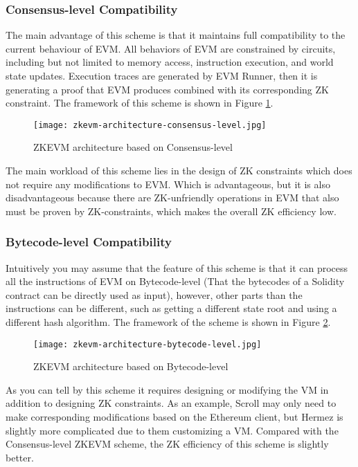\subsubsection{Consensus-level Compatibility}

The main advantage of this scheme is that it maintains full compatibility to the current behaviour of EVM. All behaviors of EVM are constrained by circuits, including but not limited to memory access, instruction execution, and world state updates. Execution traces are generated by EVM Runner, then it is generating a proof that EVM produces combined with its corresponding ZK constraint. The framework of this scheme is shown in Figure \ref{fig:zkevm-architecture-consensus-level}.
\begin{figure}[!ht]
    \centering
    \texttt{[image: zkevm-architecture-consensus-level.jpg]}
    \caption{ZKEVM architecture based on Consensus-level}
    \label{fig:zkevm-architecture-consensus-level}
\end{figure}

The main workload of this scheme lies in the design of ZK constraints which does not require any modifications to EVM. Which is advantageous, but it is also disadvantageous because there are ZK-unfriendly operations in EVM that also must be proven by ZK-constraints, which makes the overall ZK efficiency low.

\subsubsection{Bytecode-level Compatibility}

Intuitively you may assume that the feature of this scheme is that it can process all the instructions of EVM on Bytecode-level (That the bytecodes of a Solidity contract can be directly used as input), however, other parts than the instructions can be different, such as getting a different state root and using a different hash algorithm. The framework of the scheme is shown in Figure \ref{fig:zkevm-architecture-bytecode-level}.
\begin{figure}[!ht]
    \centering
    \texttt{[image: zkevm-architecture-bytecode-level.jpg]}
    \caption{ZKEVM architecture based on Bytecode-level}
    \label{fig:zkevm-architecture-bytecode-level}
\end{figure}

As you can tell by this scheme it requires designing or modifying the VM in addition to designing ZK constraints. As an example, Scroll may only need to make corresponding modifications based on the Ethereum client, but Hermez is slightly more complicated due to them customizing a VM. Compared with the Consensus-level ZKEVM scheme, the ZK efficiency of this scheme is slightly better.

